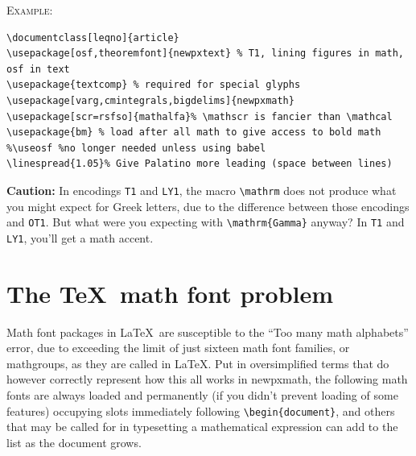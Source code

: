 \documentclass[11pt]{article}
\theoremstyle{oldplain}
\theoremstyle{plain}
\begin{document}
\textsc{Example:}
\begin{verbatim}
\documentclass[leqno]{article}
\usepackage[osf,theoremfont]{newpxtext} % T1, lining figures in math, osf in text
\usepackage{textcomp} % required for special glyphs
\usepackage[varg,cmintegrals,bigdelims]{newpxmath}
\usepackage[scr=rsfso]{mathalfa}% \mathscr is fancier than \mathcal
\usepackage{bm} % load after all math to give access to bold math
%\useosf %no longer needed unless using babel
\linespread{1.05}% Give Palatino more leading (space between lines)
\end{verbatim}

\textbf{Caution:} In encodings {\tt T1} and {\tt LY1}, the macro \verb|\mathrm| does not produce what you might expect for Greek letters, due to the difference between those encodings and {\tt OT1}. But what were you expecting with \verb|\mathrm{Gamma}| anyway? In {\tt T1} and {\tt LY1}, you'll get a math accent.

\section{The \TeX\ math font problem}
Math font packages in \LaTeX\ are susceptible to the ``Too many math alphabets'' error, due to exceeding the limit of just sixteen math font families, or mathgroups, as they are called in \LaTeX. Put in oversimplified terms that do however correctly represent how this all works in \textsf{newpxmath}, the following math fonts are always loaded and permanently (if you didn't prevent loading of some features) occupying slots immediately following \verb|\begin{document}|, and others that may be called for in typesetting a mathematical expression can add to the list as the document grows.
\end{document}
